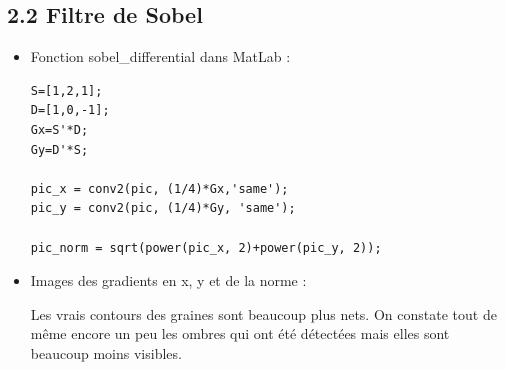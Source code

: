 \documentclass{article}
\begin{document}
\subsection*{2.2 Filtre de Sobel}

\begin{itemize}\renewcommand{\labelitemi}{$\bullet$}
	\item Fonction sobel\_differential dans MatLab :
	
\begin{lstlisting}
S=[1,2,1];
D=[1,0,-1];
Gx=S'*D;
Gy=D'*S;

pic_x = conv2(pic, (1/4)*Gx,'same');
pic_y = conv2(pic, (1/4)*Gy, 'same');

pic_norm = sqrt(power(pic_x, 2)+power(pic_y, 2));
\end{lstlisting}

	\item Images des gradients en x, y et de la norme :

\begin{center}
\end{center}

Les vrais contours des graines sont beaucoup plus nets. On constate tout de même encore un peu les ombres qui ont été détectées mais elles sont beaucoup moins visibles.
\end{itemize}
\end{document}
